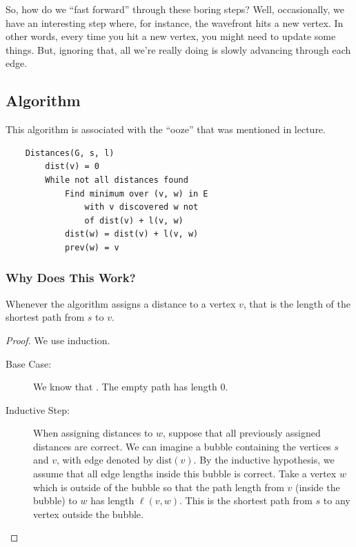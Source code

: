 \documentclass[letterpaper]{article}
\begin{document}
\bigskip 

So, how do we ``fast forward'' through these boring steps? Well, occasionally, we have an interesting step where, for instance, the wavefront hits a new vertex. In other words, every time you hit a new vertex, you might need to update some things. But, ignoring that, all we're really doing is slowly advancing through each edge. 

\subsection{Algorithm}
This algorithm is associated with the ``ooze'' that was mentioned in lecture. 
\begin{verbatim}
    Distances(G, s, l)
        dist(v) = 0
        While not all distances found 
            Find minimum over (v, w) in E
                with v discovered w not 
                of dist(v) + l(v, w)
            dist(w) = dist(v) + l(v, w)
            prev(w) = v
\end{verbatim}

\subsubsection{Why Does This Work?}
\begin{proposition}
    Whenever the algorithm assigns a distance to a vertex $v$, that is the length of the shortest path from $s$ to $v$. 
\end{proposition}

\begin{mdframed}[]
    \begin{proof}
        We use induction.
        \begin{description}
            \item[Base Case:] We know that . The empty path has length 0. 
            \item[Inductive Step:] When assigning distances to $w$, suppose that all previously assigned distances are correct. We can imagine a bubble containing the vertices $s$ and $v$, with edge denoted by $\text{dist}(v)$. By the inductive hypothesis, we assume that all edge lengths inside this bubble is correct. Take a vertex $w$ which is outside of the bubble so that the path length from $v$ (inside the bubble) to $w$ has length $\ell(v, w)$. This is the shortest path from $s$ to any vertex outside the bubble. 
        \end{description}
    \end{proof}
\end{mdframed}
\end{document}
